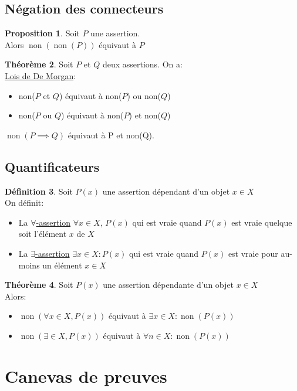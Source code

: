 \documentclass[10pt,a4paper]{article}
\theoremstyle{definition}
\newtheorem{proposition}{Proposition}[section]
\newtheorem{theorem}[proposition]{Théorème}
\newtheorem{definition}[proposition]{Définition}
\DeclareMathOperator{\non}{non}
\begin{document}
\subsection{Négation des connecteurs}
\begin{proposition}
Soit $P$ une assertion. \\
Alors $\non(\non(P))$ équivaut à $P$
\end{proposition}
\begin{theorem}
Soit $P$ et $Q$ deux assertions. On a: \\
\uline{Lois de De Morgan}:
\begin{itemize}
\item non($P$ et $Q$) équivaut à non($P$) ou non($Q$)
\item non($P$ ou $Q$) équivaut à non($P$) et non($Q$)  
\end{itemize}
$ \non(P \implies Q) $ équivaut à P et non(Q).
\end{theorem}

\subsection{Quantificateurs}
\begin{definition}
Soit $P(x)$ une assertion dépendant d'un objet $x \in X$ \\
On définit:
\begin{itemize}
\item La \uline{$\forall$-assertion} $\forall x \in X$, $P(x)$ qui est vraie quand $P(x)$ est vraie quelque soit l'élément $x$ de $X$
\item La \uline{$\exists$-assertion} $\exists x \in X: P(x)$ qui est vraie quand $P(x)$ est vraie pour au-moins un élément $x \in X$
\end{itemize}
\end{definition}
\begin{theorem}
Soit $P(x)$ une assertion dépendante d'un objet $x \in X$ \\
Alors:
\begin{itemize}
\item $\non\left(\forall x \in X, P(x)\right)$ équivaut à $\exists x \in X: \non(P(x))$
\item $\non\left(\exists \in X, P(x)\right)$ équivaut à $\forall n \in X: \non(P(x))$
\end{itemize}
\end{theorem}

\section{Canevas de preuves}
\end{document}
